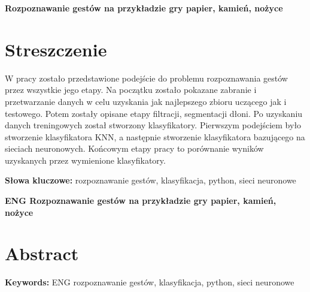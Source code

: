 \newpage
\begin{center}
\large \bf
Rozpoznawanie gestów na przykładzie gry papier, kamień, nożyce
\end{center}

\section*{Streszczenie}
W pracy zostało przedstawione podejście do problemu rozpoznawania gestów przez wszystkie jego etapy. Na początku zostało pokazane zabranie i przetwarzanie danych w celu uzyskania jak najlepszego zbioru uczącego jak i testowego. Potem zostały opisane etapy filtracji, segmentacji dłoni. Po uzyskaniu danych treningowych został stworzony klasyfikatory. Pierwszym podejściem było stworzenie klasyfikatora KNN, a następnie stworzenie klasyfikatora bazującego na sieciach neuronowych. Końcowym etapy pracy to porównanie wyników uzyskanych przez wymienione klasyfikatory.

\bigskip
{\noindent\bf Słowa kluczowe:} rozpoznawanie gestów, klasyfikacja, python, sieci neuronowe

\vskip 2cm


\begin{center}
\large \bf
ENG Rozpoznawanie gestów na przykładzie gry papier, kamień, nożyce
\end{center}

\section*{Abstract}

\bigskip
{\noindent\bf Keywords:} ENG rozpoznawanie gestów, klasyfikacja, python, sieci neuronowe

\vfill